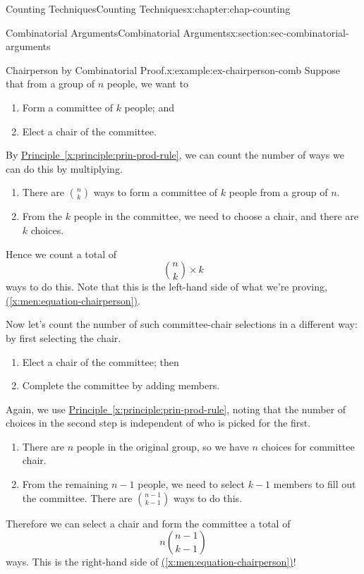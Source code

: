 \documentclass[oneside,10pt,]{book}
\newcommand{\xreffont}{\relax}
\numberwithin{equation}{section}
\begin{document}
\begin{chapterptx}{Counting Techniques}{}{Counting Techniques}{}{}{x:chapter:chap-counting}
\begin{sectionptx}{Combinatorial Arguments}{}{Combinatorial Arguments}{}{}{x:section:sec-combinatorial-arguments}
\begin{example}{Chairperson by Combinatorial Proof.}{x:example:ex-chairperson-comb}
Suppose that from a group of \(n\) people, we want to%
\begin{enumerate}
\item{}Form a committee of \(k\) people; and%
\item{}Elect a chair of the committee.%
\end{enumerate}
By \hyperref[x:principle:prin-prod-rule]{Principle~{\xreffont\ref{x:principle:prin-prod-rule}}}, we can count the number of ways we can do this by multiplying.%
\begin{enumerate}
\item{}There are \(\binom{n}{k}\) ways to form a committee of \(k\) people from a group of \(n\).%
\item{}From the \(k\) people in the committee, we need to choose a chair, and there are \(k\) choices.%
\end{enumerate}
Hence we count a total of%
\begin{equation*}
\binom{n}{k} \times k
\end{equation*}
ways to do this. Note that this is the left-hand side of what we're proving, \hyperref[x:men:equation-chairperson]{({\xreffont\ref{x:men:equation-chairperson}})}.%
\par
Now let's count the number of such committee-chair selections in a different way: by first selecting the chair.%
\begin{enumerate}
\item{}Elect a chair of the committee; then%
\item{}Complete the committee by adding members.%
\end{enumerate}
Again, we use \hyperref[x:principle:prin-prod-rule]{Principle~{\xreffont\ref{x:principle:prin-prod-rule}}}, noting that the number of choices in the second step is independent of who is picked for the first.%
\begin{enumerate}
\item{}There are \(n\) people in the original group, so we have \(n\) choices for committee chair.%
\item{}From the remaining \(n-1\) people, we need to select \(k-1\) members to fill out the committee. There are \(\binom{n-1}{k-1}\) ways to do this.%
\end{enumerate}
Therefore we can select a chair and form the committee a total of%
\begin{equation*}
n\binom{n-1}{k-1}
\end{equation*}
ways. This is the right-hand side of \hyperref[x:men:equation-chairperson]{({\xreffont\ref{x:men:equation-chairperson}})}!%

\end{example}
\end{sectionptx}
\end{chapterptx}
\end{document}
